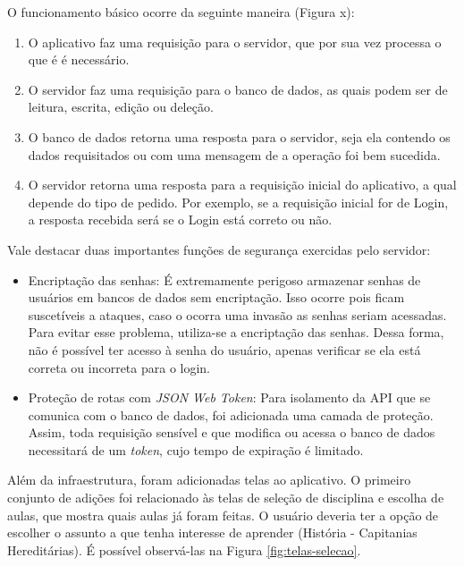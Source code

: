 O funcionamento básico ocorre da seguinte maneira (Figura x):
\begin{enumerate}
    \item O aplicativo faz uma requisição para o servidor, que por sua vez processa o que é é necessário.
    
    \item O servidor faz uma requisição para o banco de dados, as quais podem ser de leitura, escrita, edição ou deleção.
    
    \item O banco de dados retorna uma resposta para o servidor, seja ela contendo os dados requisitados ou com uma mensagem de a operação foi bem sucedida.
    
    \item O servidor retorna uma resposta para a requisição inicial do aplicativo, a qual depende do tipo de pedido. Por exemplo, se a requisição inicial for de Login, a resposta recebida será se o Login está correto ou não.
\end{enumerate}


Vale destacar duas importantes funções de segurança exercidas pelo servidor:
\begin{itemize}
    \item Encriptação das senhas: É extremamente perigoso armazenar senhas de usuários em bancos de dados sem encriptação. Isso ocorre pois ficam suscetíveis a ataques, caso o ocorra uma invasão as senhas seriam acessadas. Para evitar esse problema, utiliza-se a encriptação das senhas. Dessa forma, não é possível ter acesso à senha do usuário, apenas verificar se ela está correta ou incorreta para o login.
    
    \item Proteção de rotas com \textit{JSON Web Token}: Para isolamento da API que se comunica com o banco de dados, foi adicionada uma camada de proteção. Assim, toda requisição sensível e que modifica ou acessa o banco de dados necessitará de um \textit{token}, cujo tempo de expiração é limitado.
\end{itemize}

Além da infraestrutura, foram adicionadas telas ao aplicativo. O primeiro conjunto de adições foi relacionado às telas de seleção de disciplina e escolha de aulas, que mostra quais aulas já foram feitas. O usuário deveria ter a opção de escolher o assunto a que tenha interesse de aprender (História - Capitanias Hereditárias).
É possível observá-las na Figura \ref{fig:telas-selecao}.

